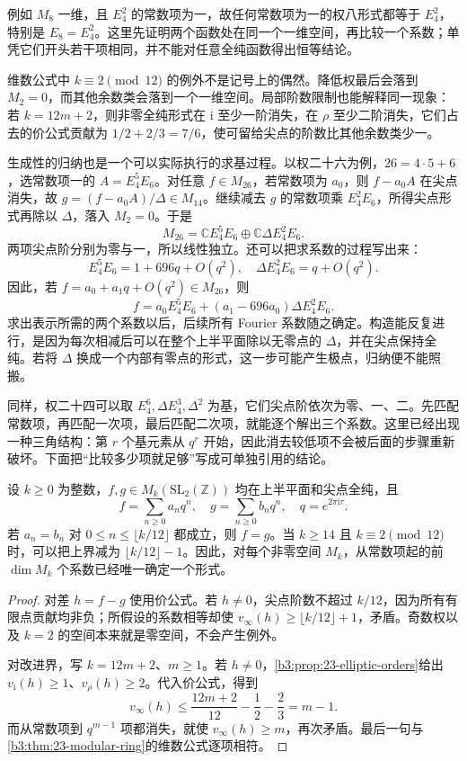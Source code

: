 例如 \(M_8\) 一维，且 \(E_4^2\) 的常数项为一，故任何常数项为一的权八形式都等于 \(E_4^2\)，特别是 \(E_8=E_4^2\)。这里先证明两个函数处在同一个一维空间，再比较一个系数；单凭它们开头若干项相同，并不能对任意全纯函数得出恒等结论。

\ProseParagraphBreak

维数公式中 \(k\equiv2\pmod{12}\) 的例外不是记号上的偶然。降低权最后会落到 \(M_2=0\)，而其他余数类会落到一个一维空间。局部阶数限制也能解释同一现象：若 \(k=12m+2\)，则非零全纯形式在 \(\mathrm{i}\) 至少一阶消失，在 \(\rho\) 至少二阶消失，它们占去的价公式贡献为 \(1/2+2/3=7/6\)，使可留给尖点的阶数比其他余数类少一。

\ProseParagraphBreak

生成性的归纳也是一个可以实际执行的求基过程。以权二十六为例，\(26=4\cdot5+6\)，选常数项一的 \(A=E_4^5E_6\)。对任意 \(f\in M_{26}\)，若常数项为 \(a_0\)，则 \(f-a_0A\) 在尖点消失，故
\(g=(f-a_0A)/\Delta\in M_{14}\)。继续减去 \(g\) 的常数项乘 \(E_4^2E_6\)，所得尖点形式再除以 \(\Delta\)，落入 \(M_2=0\)。于是
\[
 M_{26}=\mathbb C E_4^5E_6\oplus\mathbb C\Delta E_4^2E_6.
\]
两项尖点阶分别为零与一，所以线性独立。还可以把求系数的过程写出来：
\[
 E_4^5E_6=1+696q+O(q^2),\quad
 \Delta E_4^2E_6=q+O(q^2).
\]
因此，若 \(f=a_0+a_1q+O(q^2)\in M_{26}\)，则
\[
 f=a_0E_4^5E_6+(a_1-696a_0)\Delta E_4^2E_6.
\]
求出表示所需的两个系数以后，后续所有 Fourier 系数随之确定。构造能反复进行，是因为每次相减后可以在整个上半平面除以无零点的 \(\Delta\)，并在尖点保持全纯。若将 \(\Delta\) 换成一个内部有零点的形式，这一步可能产生极点，归纳便不能照搬。

\ProseParagraphBreak

同样，权二十四可以取 \(E_4^6,\Delta E_4^3,\Delta^2\) 为基，它们尖点阶依次为零、一、二。先匹配常数项，再匹配一次项，最后匹配二次项，就能逐个解出三个系数。这里已经出现一种三角结构：第 \(r\) 个基元素从 \(q^r\) 开始，因此消去较低项不会被后面的步骤重新破坏。下面把“比较多少项就足够”写成可单独引用的结论。

\begin{proposition}\label{b3:prop:23-coefficient-bound}
设 \(k\ge0\) 为整数，\(f,g\in M_k(\mathrm{SL}_2(\mathbb Z))\) 均在上半平面和尖点全纯，且
\[
 f=\sum_{n\ge0}a_nq^n,\quad
 g=\sum_{n\ge0}b_nq^n,\quad q=e^{2\pi\mathrm{i}\tau}.
\]
若 \(a_n=b_n\) 对 \(0\le n\le\lfloor k/12\rfloor\) 都成立，则 \(f=g\)。当 \(k\ge14\) 且 \(k\equiv2\pmod{12}\) 时，可以把上界减为 \(\lfloor k/12\rfloor-1\)。因此，对每个非零空间 \(M_k\)，从常数项起的前 \(\dim M_k\) 个系数已经唯一确定一个形式。
\end{proposition}
\begin{proof}
对差 \(h=f-g\) 使用价公式。若 \(h\ne0\)，尖点阶数不超过 \(k/12\)，因为所有有限点贡献均非负；所假设的系数相等却使 \(v_\infty(h)\ge\lfloor k/12\rfloor+1\)，矛盾。奇数权以及 \(k=2\) 的空间本来就是零空间，不会产生例外。

对改进界，写 \(k=12m+2\)、\(m\ge1\)。若 \(h\ne0\)，\cref{b3:prop:23-elliptic-orders}给出 \(v_{\mathrm{i}}(h)\ge1\)、\(v_\rho(h)\ge2\)。代入价公式，得到
\[
 v_\infty(h)\le\frac{12m+2}{12}-\frac12-\frac23=m-1.
\]
而从常数项到 \(q^{m-1}\) 项都消失，就使 \(v_\infty(h)\ge m\)，再次矛盾。最后一句与\cref{b3:thm:23-modular-ring}的维数公式逐项相符。
\end{proof}

